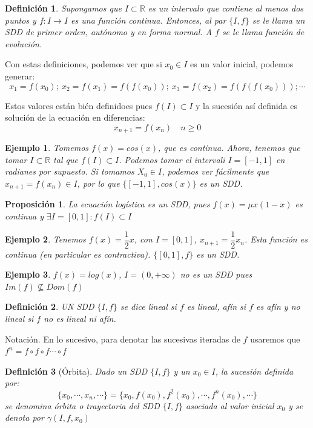 \documentclass[11pt, a4paper, titlepage]{article}
\newcommand{\R}{\mathbb{R}}
\theoremstyle{theorem-style}
\newtheorem*{nprop}{Proposición}
\theoremstyle{definition-style}
\newtheorem*{ndef}{Definición}
\theoremstyle{remark-style}
\theoremstyle{example-style}
\newtheorem*{ejemplo}{Ejemplo}
\begin{document}
\begin{ndef}
	Supongamos que $I \subset \R$ es un intervalo que contiene al menos dos puntos y $f:I \to I$ es una función continua. Entonces, al par $\{I,f\}$ se le llama un SDD de primer orden, autónomo y en forma normal. A $f$ se le llama función de evolución.
\end{ndef}

Con estas definiciones, podemos ver que si $x_0 \in I$ es un valor inicial, podemos generar:
\[
x_1 = f(x_0); \ x_2 = f(x_1) = f(f(x_0)); \ x_3 = f(x_2) = f(f(f(x_0))); \cdots
\]

Estos valores están bién definidoes pues $f(I) \subset I$ y la sucesión así definida es solución de la ecuación en diferencias:
\[
x_{n+1} = f(x_n) \quad n \geq 0
\]
\begin{ejemplo}
	Tomemos $f(x) = cos(x)$, que es continua. Ahora, tenemos que tomar $I \subset \R$ tal que $f(I) \subset I$. Podemos tomar el intervali $I=[-1,1]$ en radianes por supuesto.
	Si tomamos $X_0\in I$, podemos ver fácilmente que $x_{n+1}=f(x_n) \in I$, por lo que $\{[-1,1],cos(x)\}$ es un SDD.
\end{ejemplo}

\begin{nprop}La ecuación logística es un SDD, pues $f(x) = \mu x(1-x)$ es continua y $\exists I = [0,1]: f(I) \subset I$
	
\end{nprop}

\begin{ejemplo}
	Tenemos $f(x) = \dfrac{1}{2}x$, con $I = [0,1]$, $x_{n+1} = \dfrac{1}{2}x_n$. Esta función es continua (en particular es contractiva). $\{[0,1],f\}$ es un SDD.
\end{ejemplo}
\begin{ejemplo}
	$f(x) = log(x)$, $I=(0,+\infty)$ no es un SDD pues $Im(f) \nsubseteq Dom(f)$
\end{ejemplo}

\begin{ndef}
	UN SDD $\{I,f\}$ se dice lineal si $f$ es lineal, afín si $f$ es afín y no lineal si $f$ no es lineal ni afín.
\end{ndef}

Notación. En lo sucesivo, para denotar las sucesivas iteradas de $f$ usaremos que $f^n = f \circ f \circ f \cdots \circ f$


\begin{ndef}[Órbita]
	Dado un SDD $\{I,f\}$ y un $x_0\in I$, la sucesión definida por:
	\[
	\{x_0,\cdots, x_n , \cdots\} = \{x_0,f(x_0),f^2(x_0),\cdots, f^n(x_0), \cdots\}
	\]
	se denomina órbita o trayectoria del SDD $\{I,f\}$ asociada al valor inicial $x_0$ y se denota por $\gamma(I,f,x_0)$
\end{ndef}
\end{document}
